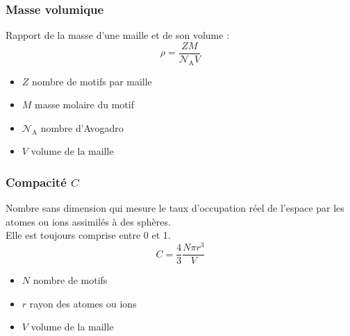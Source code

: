 \subsubsection{Masse volumique}
\begin{defi}
    Rapport de la masse d'une maille et de son volume :
    \begin{equation}
        \rho = \frac{ZM}{\mathcal{N}_\text{A}V}\label{eq:masse_volumique}
    \end{equation}
    \begin{itemize}
        \item $Z$ nombre de motifs par maille
        \item $M$ masse molaire du motif
        \item $\mathcal{N}_\text{A}$ nombre d'Avogadro
        \item $V$ volume de la maille
    \end{itemize}
\end{defi}

\subsubsection{Compacité $C$}
\begin{defi}
    Nombre sans dimension qui mesure le taux d'occupation réel de l'espace
    par les atomes ou ions assimilés à des sphères.\\
    Elle est toujours comprise entre 0 et 1.
    \begin{equation}
        C = \frac{4}{3}\frac{N \pi r^3}{V} \label{eq:comp}
    \end{equation}
    \begin{itemize}
        \item $N$ nombre de motifs
        \item $r$ rayon des atomes ou ions
        \item $V$ volume de la maille
    \end{itemize}
\end{defi}

